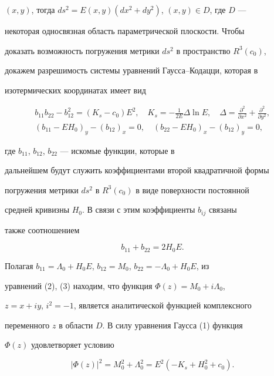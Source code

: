 $(x,y)$, тогда $ds^2=E(x,y)(dx^2+dy^2)$, $(x,y)\in D$, где $D$ --- 


некоторая односвязная область параметрической плоскости. Чтобы 


доказать возможность погружения метрики $ds^2$ в пространство $R^3(c_0)$, 


докажем разрешимость системы уравнений Гаусса--Кодацци, которая в 


изотермических координатах имеет вид 


\begin{gather} 


b_{11}b_{22}-b^2_{12}=(K_s-c_0)E^2,\quad 


K_s=-\frac{1}{2E}\Delta\ln E,\quad 


\Delta=\frac{\partial^2}{\partial x^2}+ 


\frac{\partial^2}{\partial y^2},\\ 


(b_{11}-EH_0)_y-(b_{12})_x=0,\quad 


(b_{22}-EH_0)_x-(b_{12})_y=0, 


\end{gather} 


где $b_{11}$, $b_{12}$, $b_{22}$ --- искомые функции, которые в 


дальнейшем будут служить коэффициентами второй квадратичной формы 


погружения метрики $ds^2$ в $R^3(c_0)$ в виде поверхности постоянной 


средней кривизны $H_0$. В связи с этим коэффициенты $b_{ij}$ связаны 


также соотношением 


\begin{equation} 


b_{11}+b_{22}=2H_0E. 


\end{equation} 


Полагая $b_{11}=\Lambda_0+H_0E$, $b_{12}=M_0$, $b_{22}=-\Lambda_0+H_0E$, из 


уравнений (2), (3) находим, что функция $\Phi(z)=M_0+i\Lambda_0$, 


$z=x+iy$, $i^2=-1$, является аналитической функцией комплексного 


переменного $z$ в области $D$. В силу уравнения Гаусса (1) функция 


$\Phi(z)$ удовлетворяет условию 


\begin{equation} 


|\Phi(z)|^2=M^2_0+\Lambda^2_0=E^2(-K_s+H^2_0+c_0). 


\end{equation} 



